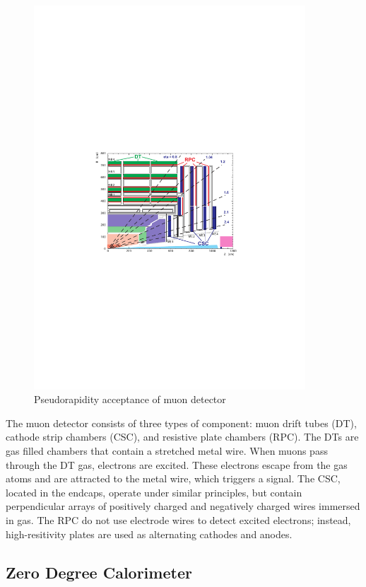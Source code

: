 \begin{figure}[h!]
\begin{centering}
\includegraphics[width=4in]{Chapter3/importfigs/Figure_001-006.pdf}
\par\end{centering}
\caption{Pseudorapidity acceptance of muon detector \label{fig:muonYZ}}
\end{figure}

The muon detector consists of three types of component: muon drift tubes (DT), cathode strip chambers (CSC), and resistive plate chambers (RPC). The DTs are gas filled chambers that contain a stretched metal wire. When muons pass through the DT gas, electrons are excited. These electrons escape from the gas atoms and are attracted to the metal wire, which triggers a signal. The CSC, located in the endcaps, operate under similar principles, but contain perpendicular arrays of positively charged and negatively charged wires immersed in gas. The RPC do not use electrode wires to detect excited electrons; instead, high-resitivity plates are used as alternating cathodes and anodes. 

\subsection{Zero Degree Calorimeter}

